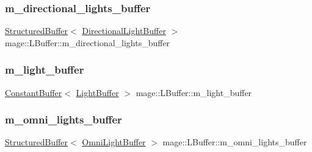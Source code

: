 \hypertarget{structmage_1_1_l_buffer_a4b371bb973c96287d7a2677b0261616e}{}\label{structmage_1_1_l_buffer_a4b371bb973c96287d7a2677b0261616e} 
\subsubsection{\texorpdfstring{m\+\_\+directional\+\_\+lights\+\_\+buffer}{m\_directional\_lights\_buffer}}
{\footnotesize\ttfamily \hyperlink{structmage_1_1_structured_buffer}{Structured\+Buffer}$<$ \hyperlink{structmage_1_1_directional_light_buffer}{Directional\+Light\+Buffer} $>$ mage\+::\+L\+Buffer\+::m\+\_\+directional\+\_\+lights\+\_\+buffer\hspace{0.3cm}{\ttfamily [private]}}

\hypertarget{structmage_1_1_l_buffer_afb068c9b4bfb5fe5415de2c94e777d85}{}\label{structmage_1_1_l_buffer_afb068c9b4bfb5fe5415de2c94e777d85} 
\subsubsection{\texorpdfstring{m\+\_\+light\+\_\+buffer}{m\_light\_buffer}}
{\footnotesize\ttfamily \hyperlink{structmage_1_1_constant_buffer}{Constant\+Buffer}$<$ \hyperlink{structmage_1_1_light_buffer}{Light\+Buffer} $>$ mage\+::\+L\+Buffer\+::m\+\_\+light\+\_\+buffer\hspace{0.3cm}{\ttfamily [private]}}

\hypertarget{structmage_1_1_l_buffer_ae7b986fae62c58aa27bd854c7eccec5c}{}\label{structmage_1_1_l_buffer_ae7b986fae62c58aa27bd854c7eccec5c} 
\subsubsection{\texorpdfstring{m\+\_\+omni\+\_\+lights\+\_\+buffer}{m\_omni\_lights\_buffer}}
{\footnotesize\ttfamily \hyperlink{structmage_1_1_structured_buffer}{Structured\+Buffer}$<$ \hyperlink{structmage_1_1_omni_light_buffer}{Omni\+Light\+Buffer} $>$ mage\+::\+L\+Buffer\+::m\+\_\+omni\+\_\+lights\+\_\+buffer\hspace{0.3cm}{\ttfamily [private]}}

